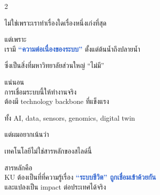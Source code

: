 \documentclass[10pt]{article}
\begin{document}
\begin{tcolorbox}[breakable,colback=panel,colframe=line,boxrule=0.5pt,arc=2mm,left=3mm,right=3mm,top=2mm,bottom=2mm]
\begin{multicols}{2}
\par ไม่ใช่เพราะเราทำเรื่องใดเรื่องหนึ่งเก่งที่สุด
\par แต่เพราะ\\ เรามี \textbf{\textcolor{highlight}{“ความต่อเนื่องของระบบ”}} ตั้งแต่ต้นน้ำถึงปลายน้ำ
\par ซึ่งเป็นสิ่งที่มหาวิทยาลัยส่วนใหญ่ “ไม่มี”
\par แน่นอน\\ การเชื่อมระบบนี้ให้ทำงานจริง\\ ต้องมี technology backbone ที่แข็งแรง
\par ทั้ง AI, data, sensors, genomics, digital twin
\par แต่ผมอยากเน้นว่า
\par เทคโนโลยีไม่ใช่สารหลักของสไลด์นี้
\par สารหลักคือ\\ KU ต้องเป็นที่ที่ความรู้เรื่อง \textbf{\textcolor{highlight}{“ระบบชีวิต” ถูกเชื่อมเข้าด้วยกัน}}\\ และแปลงเป็น impact ต่อประเทศได้จริง
\end{multicols}
\end{tcolorbox}

\clearpage
\end{document}
